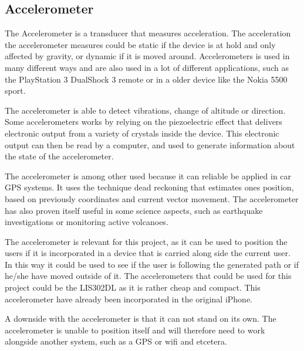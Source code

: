 \subsection{Accelerometer}

The Accelerometer is a transducer that measures acceleration. The acceleration the accelerometer measures could be static if the device is at hold and only affected by gravity, or dynamic if it is moved around\cite{acc_engi}. Accelerometers is used in many different ways and are also used in a lot of different applications, such as the PlayStation 3 DualShock 3 remote\cite{acc_ps3} or in a older device like the Nokia 5500 sport\cite{acc_nokia}.


The accelerometer is able to detect vibrations, change of altitude or direction\cite{acc_engi}. Some accelerometers works by relying on the piezoelectric effect that delivers electronic output from a variety of crystals inside the device\cite{acc_piezo}. This electronic output can then be read by a computer, and used to generate information about the state of the accelerometer.


The accelerometer is among other used because it can reliable be applied in car GPS systems. It uses the technique dead reckoning that estimates ones position, based on previously coordinates and current vector movement\cite{acc_dead}. The accelerometer has also proven itself useful in some science aspects, such as earthquake investigations or monitoring active volcanoes\cite{acc_vulkan}. 


The accelerometer is relevant for this project, as it can be used to position the users if it is incorporated in a device that is carried along side the current user. In this way it could be used to see if the user is following the generated path or if he/she have moved outside of it. The accelerometers that could be used for this project could be the LIS302DL as it is rather cheap and compact\cite{acc_price,acc_lis302dl}. This accelerometer have already been incorporated in the original iPhone\cite{acc_iPhone}.


A downside with the accelerometer is that it can not stand on its own. The accelerometer is unable to position itself and will therefore need to work alongside another system, such as a GPS or wifi and etcetera. 